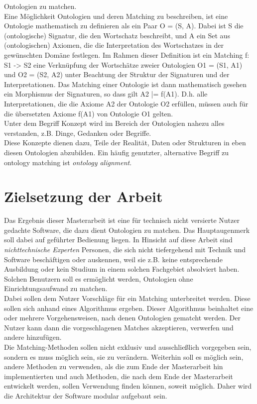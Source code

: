 Ontologien zu matchen.\\
Eine Möglichkeit Ontologien und deren Matching zu beschreiben, ist eine Ontologie mathematisch zu
definieren als ein Paar O = (S, A). Dabei ist S die (ontologische) Signatur, die
den Wortschatz beschreibt, und A ein Set aus (ontologischen) Axiomen, die die
Interpretation des Wortschatzes in der gewünschten Domäne festlegen. Im Rahmen
dieser Definition ist ein Matching f: S1 -> S2 eine Verknüpfung der Wortschätze
zweier Ontologien O1 = (S1, A1) und O2 = (S2, A2)  unter Beachtung der Struktur
der Signaturen und der Interpretationen. Das Matching einer Ontologie ist dann
mathematisch gesehen ein Morphismus der Signaturen, so dass gilt A2 |= f(A1).
D.h. alle Interpretationen, die die Axiome A2 der Ontologie O2 erfüllen, müssen
auch für die übersetzten Axiome f(A1) von Ontologie O1 gelten. \cite{Hoo14}\\
Unter dem Begriff Konzept wird im Bereich der Ontologien nahezu alles
verstanden, z.B. Dinge, Gedanken oder Begriffe. \cite{Usc95}\\
Diese Konzepte
dienen dazu, Teile der Realität, Daten oder Strukturen in eben diesen Ontologien
abzubilden. Ein häufig genutzter, alternative Begriff zu ontology
matching ist \textit{ontology alignment}.

\section{Zielsetzung der Arbeit}
Das Ergebnis dieser Masterarbeit ist eine für technisch nicht versierte Nutzer
gedachte Software, die dazu dient Ontologien zu matchen. Das Hauptaugenmerk soll
dabei auf geführter Bedienung liegen. In Hinsicht auf diese Arbeit sind
\textit{nichttechnische Experten} Personen, die sich nicht tiefergehend mit
Technik und Software beschäftigen oder auskennen, weil sie z.B. keine
entsprechende Ausbildung oder kein Studium in einem solchen Fachgebiet
absolviert haben.
Solchen Benutzern soll es ermöglicht werden, Ontologien ohne Einrichtungsaufwand
zu matchen.\\
Dabei sollen dem Nutzer Vorschläge für ein Matching unterbreitet werden. Diese
sollen sich anhand eines Algorithmus ergeben. Dieser Algorithmus
beinhaltet eine oder mehrere Vorgehensweisen, nach denen Ontologien gematcht werden. Der Nutzer
kann dann die vorgeschlagenen Matches akzeptieren, verwerfen und andere hinzufügen.\\
Die Matching-Methoden sollen nicht exklusiv und ausschließlich vorgegeben sein,
sondern es muss möglich sein, sie zu verändern. Weiterhin soll es möglich sein,
andere  Methoden zu verwenden, als die zum Ende der Masterarbeit hin
implementierten und auch Methoden, die nach dem Ende der Masterarbeit entwickelt
werden, sollen Verwendung finden können, soweit möglich. Daher wird die
Architektur der Software modular aufgebaut sein.

